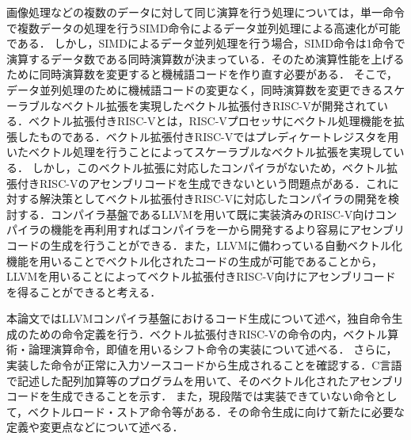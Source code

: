 画像処理などの複数のデータに対して同じ演算を行う処理については，単一命令で複数データの処理を行うSIMD命令によるデータ並列処理による高速化が可能である．
しかし，SIMDによるデータ並列処理を行う場合，SIMD命令は1命令で演算するデータ数である同時演算数が決まっている．そのため演算性能を上げるために同時演算数を変更すると機械語コードを作り直す必要がある．
そこで，データ並列処理のために機械語コードの変更なく，同時演算数を変更できるスケーラブルなベクトル拡張を実現したベクトル拡張付きRISC-Vが開発されている．ベクトル拡張付きRISC-Vとは，RISC-Vプロセッサにベクトル処理機能を拡張したものである．ベクトル拡張付きRISC-Vではプレディケートレジスタを用いたベクトル処理を行うことによってスケーラブルなベクトル拡張を実現している．
しかし，このベクトル拡張に対応したコンパイラがないため，ベクトル拡張付きRISC-Vのアセンブリコードを生成できないという問題点がある．これに対する解決策としてベクトル拡張付きRISC-Vに対応したコンパイラの開発を検討する．コンパイラ基盤であるLLVMを用いて既に実装済みのRISC-V向けコンパイラの機能を再利用すればコンパイラを一から開発するより容易にアセンブリコードの生成を行うことができる．また，LLVMに備わっている自動ベクトル化機能を用いることでベクトル化されたコードの生成が可能であることから，LLVMを用いることによってベクトル拡張付きRISC-V向けにアセンブリコードを得ることができると考える．

本論文ではLLVMコンパイラ基盤におけるコード生成について述べ，独自命令生成のための命令定義を行う．ベクトル拡張付きRISC-Vの命令の内，ベクトル算術・論理演算命令，即値を用いるシフト命令の実装について述べる．
さらに，実装した命令が正常に入力ソースコードから生成されることを確認する．C言語で記述した配列加算等のプログラムを用いて、そのベクトル化されたアセンブリコードを生成できることを示す．
また，現段階では実装できていない命令として，ベクトルロード・ストア命令等がある．その命令生成に向けて新たに必要な定義や変更点などについて述べる．